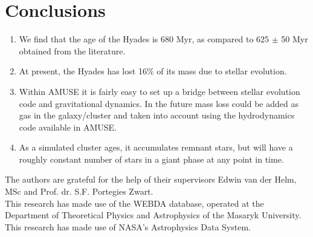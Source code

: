 \documentclass{aa}
\begin{document}
\section{Conclusions}\label{sec:conclusions}
\begin{enumerate}
    \item We find that the age of the Hyades is 680 Myr, as compared to 625 $\pm$ 50 Myr obtained from the literature.
    \item At present, the Hyades has lost 16\% of its mass due to stellar evolution.
    \item Within AMUSE it is fairly easy to set up a bridge between stellar evolution code and gravitational dynamics. In the future mass loss could be added as gas in the galaxy/cluster and taken into account using the hydrodynamics code available in AMUSE.
    \item As a simulated cluster ages, it accumulates remnant stars, but will have a roughly constant number of stars in a giant phase at any point in time.
   \end{enumerate}


\begin{acknowledgements}
The authors are grateful for the help of their supervisors Edwin van der Helm, MSc and Prof. dr. S.F. Portegies Zwart. \\

This research has made use of the WEBDA database, operated at the Department of Theoretical Physics and Astrophysics of the Masaryk University. \\

This research has made use of NASA's Astrophysics Data System.
\end{acknowledgements}





\end{document}
